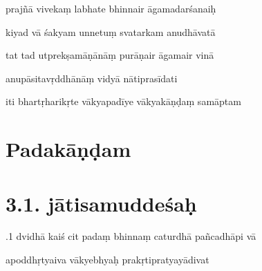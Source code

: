 \documentclass[article,12pt,a4paper]{memoir}%
\newcounter{parCount}
\begin{document}
	  
	  \pstart {} prajñā vivekaṃ labhate bhinnair āgamadarśanaiḥ 
	{}
	\pend%
      

	  
	  \pstart \leavevmode%
	kiyad vā śakyam unnetuṃ svatarkam anudhāvatā 
	{}
	\pend%
      

	  
	  \pstart {} tat tad utprekṣamāṇānāṃ purāṇair āgamair vinā 
	{}
	\pend%
      

	  
	  \pstart \leavevmode%
	anupāsitavṛddhānāṃ vidyā nātiprasīdati 
	{}
	\pend%
      

	  
	  \pstart \leavevmode%
	iti bhartṛharikṛte vākyapadīye vākyakāṇḍaṃ samāptam
	{}
	\pend%
      
	    
	    \endnumbering%
	    
	  
	  
	
	    
	    \beginnumbering%
	    
	  
\chapter[{Padakāṇḍam}][{Padakāṇḍam}]{Padakāṇḍam}
	  
	
\chapter[{3.1. jātisamuddeśaḥ}][{3.1. jātisamuddeśaḥ}]{3.1. jātisamuddeśaḥ}

	  
	  \pstart {}.1 dvidhā kaiś cit padaṃ bhinnaṃ caturdhā pañcadhāpi vā 
	{}
	\pend%
      

	  
	  \pstart \leavevmode%
	apoddhṛtyaiva vākyebhyaḥ prakṛtipratyayādivat 
	{}
	\pend%
      
\end{document}
